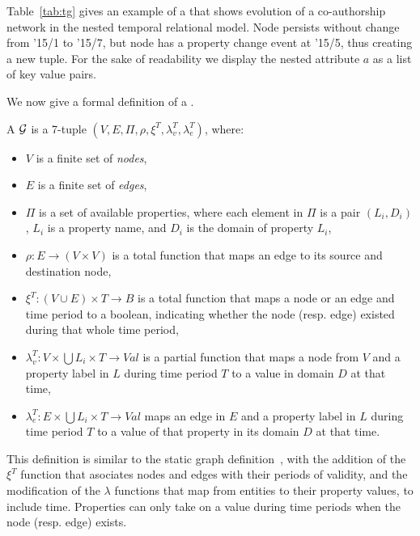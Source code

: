 Table~\ref{tab:tg} gives an example of a \tg that shows evolution of a
co-authorship network in the nested temporal relational model.  Node
 persists without change from '15/1 to '15/7, but node
 has a property change event at '15/5, thus creating a new
tuple.  For the sake of readability we display the nested attribute
$a$ as a list of key value pairs.

We now give a formal definition of a \tg.

\begin{definition}[TGraph]
\label{def:tg1}
A \tg $\mathcal{G}$ is a 7-tuple \break $(V,E,\Pi,\rho,\xi^T,\lambda^T_v,\lambda^T_e)$, where:

\begin{itemize}[noitemsep,itemindent=\dimexpr{}+\relax,leftmargin=5pt]
\item $V$ is a finite set of {\em nodes},
\item $E$ is a finite set of {\em edges},
\item $\Pi$ is a set of available properties, where each element in $\Pi$ is a pair $(L_i,D_i)$, $L_i$ is a property name, and $D_i$ is the domain of property $L_i$,
\item $\rho: E \to (V \times V)$ is a total function that maps an edge to its source and destination node,
\item $\xi^T: (V \cup E) \times T \to B$ is a total function that maps a node or an edge and time period to a boolean, indicating whether the node (resp. edge) existed during that whole time period,
\item $\lambda^T_v: V \times \bigcup L_i \times T \to Val$ is a partial function that maps a node from $V$ and a property label in $L$ during time period $T$ to a value in domain $D$ at that time,
\item $\lambda^T_e: E \times \bigcup L_i \times T \to Val$ maps an edge in $E$ and a property label in $L$ during time period $T$ to a value of that property in its domain $D$ at that time.
\end{itemize}
\end{definition}

This definition is similar to the static graph
definition~\cite{DBLP:journals/corr/AnglesABHRV16}, with the addition
of the $\xi^T$ function that asociates nodes and edges with their
periods of validity, and the modification of the $\lambda$ functions
that map from entities to their property values, to include time.
Properties can only take on a value during time periods when the node
(resp. edge) exists.

